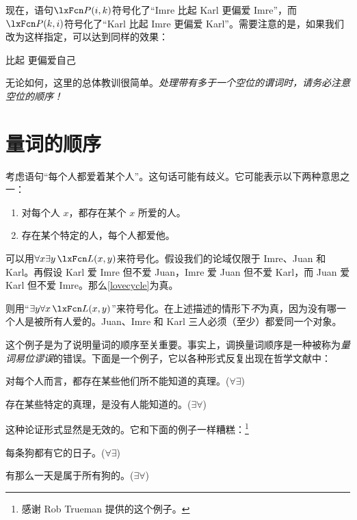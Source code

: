 现在，语句$\atom{P}{i,k}$符号化了“Imre 比起 Karl 更偏爱 Imre”，而$\atom{P}{k,i}$符号化了“Karl 比起 Imre 更偏爱 Karl”。需要注意的是，如果我们改为这样指定，可以达到同样的效果：

\begin{ekey}
	\item[\atom{P}{x,y}]  比起  更偏爱自己
\end{ekey}

无论如何，这里的总体教训很简单。\emph{处理带有多于一个空位的谓词时，请务必注意空位的顺序！}

\section{量词的顺序}\label{ss:OrderQuant}
考虑语句“每个人都爱着某个人”。这句话可能有歧义。它可能表示以下两种意思之一：

\begin{enumerate}
		\item\label{lovecycle} 对每个人 $x$，都存在某个 $x$ 所爱的人。
		\item\label{loveconverge} 存在某个特定的人，每个人都爱他。
	\end{enumerate}

可以用$\forall x \exists y\, \atom{L}{x,y}$来符号化。假设我们的论域仅限于 Imre、Juan 和 Karl。再假设 Karl 爱 Imre 但不爱 Juan，Imre 爱 Juan 但不爱 Karl，而 Juan 爱 Karl 但不爱 Imre。那么\cref*{lovecycle}为真。

则用“$\exists y \forall x\,
\atom{L}{x,y}$”来符号化。在上述描述的情形下\emph{不}为真，因为没有哪一个人是被所有人爱的。Juan、Imre 和 Karl 三人必须（至少）都爱同一个对象。

这个例子是为了说明量词的顺序至关重要。事实上，调换量词顺序是一种被称为\emph{量词易位谬误}的错误。下面是一个例子，它以各种形式反复出现在哲学文献中：

\begin{earg}
		\item[] 对每个人而言，都存在某些他们所不能知道的真理。\hfill ($\forall \exists$)
		\item[\texttherefore] 存在某些特定的真理，是没有人能知道的。\hfill ($\exists \forall$)
	\end{earg}

这种论证形式显然是无效的。它和下面的例子一样糟糕：\footnote{感谢 Rob Trueman 提供的这个例子。}

\begin{earg}
		\item[] 每条狗都有它的日子。\hfill ($\forall \exists$)
		\item[\texttherefore] 有那么一天是属于所有狗的。\hfill ($\exists \forall$)
	\end{earg}

